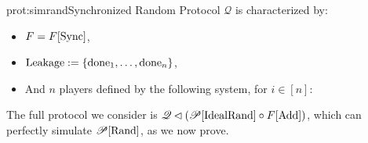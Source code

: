 \begin{protocol}{prot:simrand}{Synchronized Random Protocol}
    $\mathscr{Q}$ is characterized by:
    \begin{itemize}
        \item $F = F[\text{Sync}]$,
        \item $\text{Leakage} := \{\text{done}_1, \ldots, \text{done}_n\}$,
        \item And $n$ players defined by the following system, for $i \in [n]$:
    \end{itemize}
\end{protocol}

The full protocol we consider is $\mathscr{Q} \lhd (\mathscr{P}[\text{IdealRand}] \circ F[\text{Add}])$,
which can perfectly simulate $\mathscr{P}[\text{Rand}]$, as we now prove.

